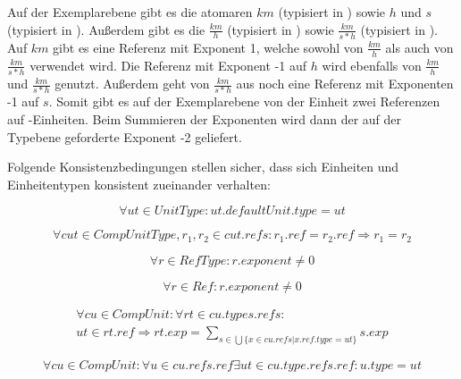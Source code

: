 Auf der Exemplarebene gibt es die atomaren  $km$ (typisiert in ) sowie $h$ und $s$ (typisiert in ). 
Außerdem gibt es die  $\frac{km}{h}$ (typisiert in ) 
sowie $\frac{km}{s*h}$ (typisiert in ). Auf $km$ gibt es eine Referenz mit Exponent 1, 
welche sowohl von $\frac{km}{h}$ als auch von $\frac{km}{s*h}$ verwendet wird. 
Die Referenz mit Exponent -1 auf $h$ wird ebenfalls von $\frac{km}{h}$ und $\frac{km}{s*h}$ genutzt. 
Außerdem geht von $\frac{km}{s*h}$ aus noch eine Referenz mit Exponenten -1 auf $s$. 
Somit gibt es auf der Exemplarebene von der Einheit  zwei Referenzen auf -Einheiten. 
Beim Summieren der Exponenten wird dann der auf der Typebene geforderte Exponent -2 geliefert.

\newpage
{}

Folgende Konsistenzbedingungen stellen sicher, dass sich Einheiten und Einheitentypen konsistent zueinander verhalten:

\begin{equation} \forall ut \in UnitType : ut.defaultUnit.type = ut \end{equation}

\begin{equation} \forall cut \in CompUnitType, r_1, r_2 \in cut.refs : r_1.ref = r_2.ref \Rightarrow r_1 = r_2 \end{equation}

\begin{equation} \forall r \in RefType : r.exponent \ne 0 \end{equation}

\begin{equation} \forall r \in Ref : r.exponent \ne 0 \end{equation}

\begin{equation} 
\begin{split}
\forall cu \in CompUnit: \forall rt \in cu.types.refs:\\
ut \in rt.ref \Rightarrow rt.exp = \sum_{s \in \bigcup \{ x \in cu.refs | x.ref.type = ut \}} s.exp 
\end{split}
\end{equation}

 
\begin{equation} \forall cu \in CompUnit :
\forall u \in cu.refs.ref \exists ut \in cu.type.refs.ref : u.type = ut \end{equation}

